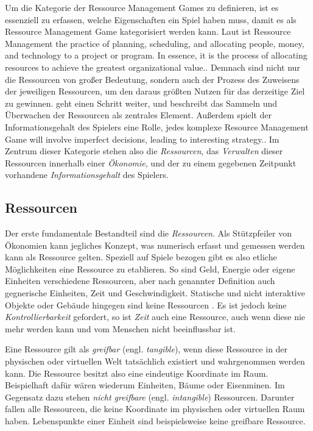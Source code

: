 
Um die Kategorie der Ressource Management Games zu definieren, ist es essenziell zu erfassen, welche Eigenschaften ein Spiel haben muss, damit es als Ressource Management Game kategorisiert werden kann. Laut \cite*[]{definition:ressourcemanagement} ist Ressource Management \glqq [...] the practice of planning, scheduling, and allocating people, money, and technology to a project or program. In essence, it is the process of allocating resources to achieve the greatest organizational value.\grqq. Demnach sind nicht nur die Ressourcen von großer Bedeutung, sondern auch der Prozess des Zuweisens der jeweiligen Ressourcen, um den daraus größten Nutzen für das derzeitige Ziel zu gewinnen. \cite*[]{definition:ressourcemanagementfandom} geht einen Schritt weiter, und beschreibt das Sammeln und Überwachen der Ressourcen als zentrales Element. Außerdem spielt der Informationsgehalt des Spielers eine Rolle, jedes komplexe Resource Management Game \glqq [...] will involve imperfect decisions, leading to interesting strategy.\grqq \cite*[]{definition:ressourcemanagementfandom}. 
Im Zentrum dieser Kategorie stehen also die \textit{Ressourcen}, das \textit{Verwalten} dieser Ressourcen innerhalb einer \textit{Ökonomie}, und der zu einem gegebenen Zeitpunkt vorhandene \textit{Informationsgehalt} des Spielers.

\subsection{Ressourcen}
Der erste fundamentale Bestandteil sind die \textit{Ressourcen}. Als Stützpfeiler von Ökonomien kann jegliches Konzept, was numerisch erfasst und gemessen werden kann als Ressource gelten. Speziell auf Spiele bezogen gibt es also etliche Möglichkeiten eine Ressource zu etablieren. So sind Geld, Energie oder eigene Einheiten verschiedene Ressourcen, aber nach genannter Definition auch gegnerische Einheiten, Zeit und Geschwindigkeit. Statische und nicht interaktive Objekte oder Gebäude hingegen sind keine Ressourcen \cite*[]{book:gamedesign:resources}. Es ist jedoch keine \textit{Kontrollierbarkeit} gefordert, so ist \textit{Zeit} auch eine Ressource, auch wenn diese nie mehr werden kann und vom Menschen nicht beeinflussbar ist.

Eine Ressource gilt als \textit{greifbar} (engl. \textit{tangible}), wenn diese Ressource in der physischen oder virtuellen Welt tatsächlich existiert und wahrgenommen werden kann. Die Ressource besitzt also eine eindeutige Koordinate im Raum. Beispielhaft dafür wären wiederum Einheiten, Bäume oder Eisenminen. Im Gegensatz dazu stehen \textit{nicht greifbare} (engl. \textit{intangible}) Ressourcen. Darunter fallen alle Ressourcen, die keine Koordinate im physischen oder virtuellen Raum haben. Lebenspunkte einer Einheit sind beispielsweise keine greifbare Ressource. 

